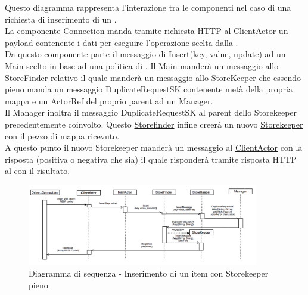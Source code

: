 \documentclass{scalatekids-article}
\begin{document}
Questo diagramma rappresenta l'interazione tra le componenti nel caso di una richiesta di inserimento di un .\\
La componente \hyperref[sec:actorbase::driver::client::Connection]{Connection}
manda tramite richiesta HTTP al \hyperref[sec:actorbase::actorsystem::actors::clientactor::ClientActor]{ClientActor}
un payload contenente i dati per eseguire l'operazione scelta dalla .\\
Da questo componente parte il messaggio di Insert(key, value, update) ad un \hyperref[sec:actorbase::actorsystem::actors::main::Main]{Main} scelto in base
ad una politica di .
Il \hyperref[sec:actorbase::actorsystem::actors::main::Main]{Main} manderà un messaggio allo \hyperref[sec:actorbase::actorsystem::actors::storefinder::StoreFinder]{StoreFinder} relativo il quale manderà
un messaggio allo \hyperref[sec:actorbase::actorsystem::actors::storekeeper::StoreKeeper]{StoreKeeper} che essendo pieno manda un
messaggio DuplicateRequestSK contenente metà della propria mappa e un ActorRef del proprio parent ad un
\hyperref[sec:actorbase::actorsystem::actors::manager::Manager]{Manager}.\\
Il Manager inoltra il messaggio DuplicateRequestSK al parent dello Storekeeper precedentemente coinvolto.
Questo \hyperref[sec:actorbase::actorsystem::actors::storefinder::Storefinder]{Storefinder} infine creerà un nuovo
\hyperref[sec:actorbase::actorsystem::actors::storekeeper::Storekeeper]{Storekeeper} con il pezzo di mappa ricevuto.\\
A questo punto il nuovo Storekeeper manderà un messaggio al \hyperref[sec:actorbase::actorsystem::actors::clientactor::ClientActor]{ClientActor} con
la risposta (positiva o negativa che sia) il quale risponderà tramite risposta HTTP al  con il risultato.
\begin{figure}[H]
  \begin{center}
    \includegraphics[width=0.9\textwidth, keepaspectratio]{img/diagrammiSequenza/esempioInsertFull.png}
    \caption{Diagramma di sequenza - Inserimento di un item con Storekeeper pieno}
  \end{center}
\end{figure}
\end{document}
